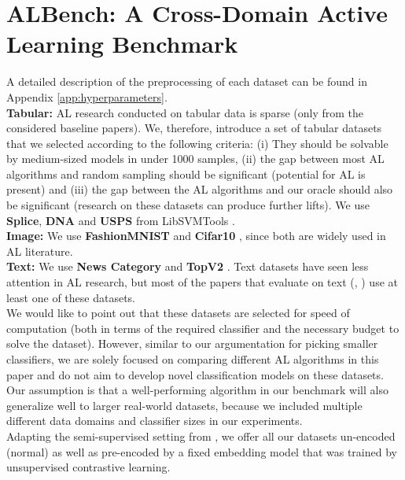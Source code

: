 \documentclass[]{article}
\begin{document}
\section{ALBench: A Cross-Domain Active Learning Benchmark}\label{sec:datasets}
A detailed description of the preprocessing of each dataset can be found in Appendix \ref{app:hyperparameters}. \\ [1mm]
\textbf{Tabular:}
AL research conducted on tabular data is sparse (only \cite{ashdeep} from the considered baseline papers). 
We, therefore, introduce a set of tabular datasets that we selected according to the following criteria:
(i) They should be solvable by medium-sized models in under 1000 samples, (ii) the gap between most AL algorithms and random sampling should be significant (potential for AL is present) and (iii) the gap between the AL algorithms and our oracle should also be significant (research on these datasets can produce further lifts).
We use \textbf{Splice}, \textbf{DNA} and \textbf{USPS} from LibSVMTools \cite{libsvmtools}.\\
\textbf{Image:}
We use \textbf{FashionMNIST} \cite{xiao2017fashion} and \textbf{Cifar10} \cite{krizhevsky2009learning}, since both are widely used in AL literature.\\
\textbf{Text:}
We use \textbf{News Category} \cite{misra2022news} and \textbf{TopV2} \cite{chen-etal-2020-low-resource}.
Text datasets have seen less attention in AL research, but most of the papers that evaluate on text (\cite{hu2021towards}, \cite{zhou2021towards}) use at least one of these datasets.\\ [1mm]
%
We would like to point out that these datasets are selected for speed of computation (both in terms of the required classifier and the necessary budget to solve the dataset). 
However, similar to our argumentation for picking smaller classifiers, we are solely focused on comparing different AL algorithms in this paper and do not aim to develop novel classification models on these datasets.
Our assumption is that a well-performing algorithm in our benchmark will also generalize well to larger real-world datasets, because we included multiple different data domains and classifier sizes in our experiments. \\ [1mm]
Adapting the semi-supervised setting from \cite{hacohen2022active}, we offer all our datasets un-encoded (normal) as well as pre-encoded by a fixed embedding model that was trained by unsupervised contrastive learning. 
\end{document}
